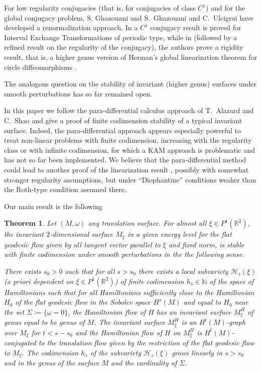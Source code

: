 \documentclass[11pt]{amsart}
\newcommand \R {{ \mathbb R}}
\newcommand \N {{ \mathbb N}}
\newtheorem{theorem}{Theorem}[section]
\begin{document}
\smallskip
For low regularity conjugacies (that is, for conjugacies of class $C^1$) and for the global conjugacy problem, S. Ghazouani \cite{Gh21}  and S.~Ghazouani and C.~Ulcigrai \cite{GU23} 
have developed a renormalization approach. In \cite{Gh21} a $C^1$ conjugacy result is proved for Interval Exchange Transformations of periodic type, while in \cite{GU23} (followed
by a refined result \cite{GU25} on the regularity of the conjugacy),
the authors prove a rigidity result, that is, a higher genus version of Herman's global linearization theorem for circle diffeomorphisms \cite{He79}.

\smallskip
The analogous question on the stability of invariant (higher genus) surfaces under smooth perturbations has so far remained open. 

\medskip
In this paper we follow the para-differential calculus approach of T.~Alazard and C.~Shao \cite{AlSh} and give a proof of finite codimension stability of a typical invariant
surface. Indeed, the para-differential approach appears especially powerful to treat non-linear problems with finite codimension, increasing with the regularity class
or with infinite codimension, for which a KAM approach is problematic and has not so far been implemented. We believe that the para-differential method
could lead to another proof of the linearization result \cite{MMY12}, possibly with somewhat stronger regularity assumptions, but under ``Diophantine'' conditions weaker than
the Roth-type condition assumed there.

\medskip
Our main result is the following 
\begin{theorem}
\label{thm:main}
Let $(M, \omega)$ any translation surface. For almost all $\xi \in P^1(\R^2)$, the invariant $2$-dimensional surface $M_\xi$ in a given energy level for the flat geodesic 
flow given by all tangent vector parallel to $\xi$ and fixed norm, is stable with finite codimension under smooth perturbations in the the following sense.  

There exists $s_0>0$ such that 
for all $s>s_0$ there exists a local subvariety  $\mathcal H_s(\xi)$ (a priori dependent on $\xi \in P^1(\R^2)$)  of finite codimension $h_s\in \N$ of the space of Hamiltonians  such that for all Hamiltonians 
sufficiently close to the Hamiltonian$H_0$ of the flat geodesic flow in the Sobolev space $H^s(M)$ and equal to $H_0$  near the set $\Sigma:=\{\omega =0\}$, 
the Hamiltonian flow of $H$ has an invariant surface $M^H_\xi$ of genus equal to he genus of $M$. The invariant surface   $M^H_\xi$ is an $H^t(M)$-graph over 
$M_\xi$  for $t<s-s_0$ and the Hamiltonian flow of $H$ on $M^H_\xi$ is $H^t(M)$-conjugated to the translation flow given by the restriction of the flat geodesic flow to $M_\xi$. 
The codimension $h_s$ of the subvariety $\mathcal H_s(\xi)$ grows linearly in $s>s_0$ and in the genus of the surface $M$ and the cardinality of $\Sigma$.
\end{theorem} 
\end{document}
